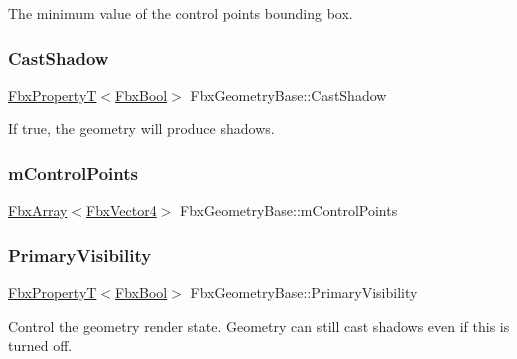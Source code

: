 The minimum value of the control points bounding box. 

\mbox{\label{class_fbx_geometry_base_a64d3184a3bf9bcd97f7069176b0ad4c1}} 
\subsubsection{\texorpdfstring{Cast\+Shadow}{CastShadow}}
{\footnotesize\ttfamily \hyperlink{class_fbx_property_t}{Fbx\+PropertyT}$<$\hyperlink{fbxtypes_8h_a92e0562b2fe33e76a242f498b362262e}{Fbx\+Bool}$>$ Fbx\+Geometry\+Base\+::\+Cast\+Shadow}



If true, the geometry will produce shadows. 

\mbox{\label{class_fbx_geometry_base_a88c6c0552ceb07b3a638cc3175fbe867}} 
\subsubsection{\texorpdfstring{m\+Control\+Points}{mControlPoints}}
{\footnotesize\ttfamily \hyperlink{class_fbx_array}{Fbx\+Array}$<$\hyperlink{class_fbx_vector4}{Fbx\+Vector4}$>$ Fbx\+Geometry\+Base\+::m\+Control\+Points}

\mbox{\label{class_fbx_geometry_base_a51e2206786ddb6a94a15be4a8fd9517f}} 
\subsubsection{\texorpdfstring{Primary\+Visibility}{PrimaryVisibility}}
{\footnotesize\ttfamily \hyperlink{class_fbx_property_t}{Fbx\+PropertyT}$<$\hyperlink{fbxtypes_8h_a92e0562b2fe33e76a242f498b362262e}{Fbx\+Bool}$>$ Fbx\+Geometry\+Base\+::\+Primary\+Visibility}



Control the geometry render state. Geometry can still cast shadows even if this is turned off. 

